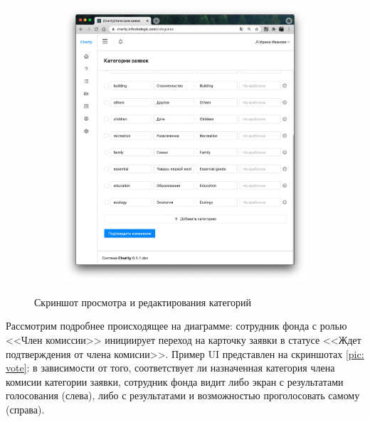 \documentclass[a4paper,12pt,reqno]{article}
\begin{document}
\begin{figure}[H]
	    \centering
		\begin{subfigure}[b]{0.475\linewidth}
			\includegraphics[width=\linewidth]{img/ro/categories.png}
		\end{subfigure}
		\caption{Скриншот просмотра и редактирования категорий}
		\label{pic: categories}
\end{figure}

Рассмотрим подробнее происходящее на диаграмме: сотрудник фонда с ролью <<Член комиссии>> инициирует переход на карточку заявки в статусе <<Ждет подтверждения от члена комисии>>.  Пример UI представлен на скриншотах \ref{pic: vote}: в зависимости от того, соответствует ли назначенная категория члена комисии категории заявки, сотрудник фонда видит либо экран с результатами голосования (слева), либо с результатами и возможностью проголосовать самому (справа).
\end{document}

